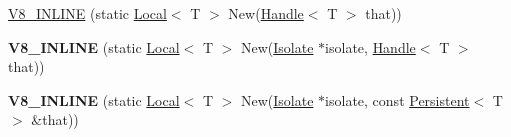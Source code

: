 \begin{DoxyCompactItemize}
\item 
\hyperlink{classv8_1_1_local_a4bcce5962fa2f2b9131a110f79350e7c}{V8\+\_\+\+I\+N\+L\+I\+N\+E} (static \hyperlink{classv8_1_1_local}{Local}$<$ T $>$ New(\hyperlink{classv8_1_1_handle}{Handle}$<$ T $>$ that))
\item 
\hypertarget{classv8_1_1_local_a8b0ac03c4da07a94a9cb91620a0062d9}{}{\bfseries V8\+\_\+\+I\+N\+L\+I\+N\+E} (static \hyperlink{classv8_1_1_local}{Local}$<$ T $>$ New(\hyperlink{classv8_1_1_isolate}{Isolate} $\ast$isolate, \hyperlink{classv8_1_1_handle}{Handle}$<$ T $>$ that))\label{classv8_1_1_local_a8b0ac03c4da07a94a9cb91620a0062d9}

\item 
\hypertarget{classv8_1_1_local_a9c051652a3b358357eac451b3ed10fa1}{}{\bfseries V8\+\_\+\+I\+N\+L\+I\+N\+E} (static \hyperlink{classv8_1_1_local}{Local}$<$ T $>$ New(\hyperlink{classv8_1_1_isolate}{Isolate} $\ast$isolate, const \hyperlink{classv8_1_1_persistent}{Persistent}$<$ T $>$ \&that))\label{classv8_1_1_local_a9c051652a3b358357eac451b3ed10fa1}

\end{DoxyCompactItemize}
